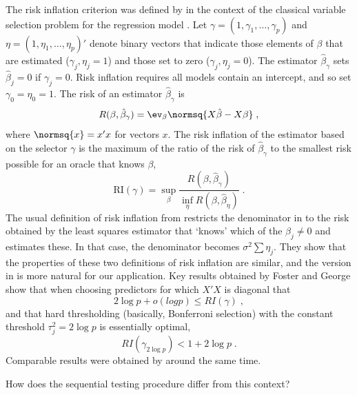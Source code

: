 \documentclass[12pt]{article}
\begin{document}
 The risk inflation criterion was defined by \citet{fostergeorge94} in the
 context of the classical variable selection problem for the regression model
 .  Let $\gamma = (1, \gamma_1, \ldots, \gamma_p)$ and $\eta = (1,
 \eta_1, \ldots,\eta_p)'$ denote binary vectors that indicate those elements of
 $\beta$ that are estimated ($\gamma_j,\eta_j=1$) and those set to zero
 ($\gamma_j,\eta_j = 0$).  The estimator $\hat\beta_\gamma$ sets $\hat\beta_j =
 0$ if $\gamma_j=0$.  Risk inflation requires all models contain an intercept,
 and so set $\gamma_0=\eta_0=1$.  The risk of an estimator $\hat\beta_\gamma$ is
 \begin{equation}
    R(\beta, \hat\beta_\gamma) = \ev_\beta \normsq{X\hat\beta - X\beta}  \;,
 \label{eq:risk}
 \end{equation}
 where $\normsq{x} = x'x$ for vectors $x$.  The risk inflation of the estimator
 based on the selector $\gamma$ is the maximum of the ratio of the risk of
 $\hat\beta_\gamma$ to the smallest risk possible for an oracle that knows
 $\beta$,
 \begin{equation}
    \mbox{RI}(\gamma) = \sup_\beta 
                        \frac{R(\beta, \hat\beta_\gamma)}
                        {\inf_\eta{R(\beta, \hat\beta_\eta)}}   \;.
 \label{eq:ri}
 \end{equation}
 The usual definition of risk inflation from \citet{fostergeorge94} restricts
 the denominator in  to the risk obtained by the least squares
 estimator that `knows' which of the $\beta_j \ne 0$ and estimates these.  In
 that case, the denominator becomes $\sigma^2 \sum \eta_j$.  They show that the
 properties of these two definitions of risk inflation are similar, and the
 version in  is more natural for our application.  Key results
 obtained by Foster and George show that when choosing predictors for which $X'X$
 is diagonal that
 \begin{equation}
     2 \log p + o(log p) \le  RI(\gamma) \;,
 \label{eq:lower}
 \end{equation}
 and that hard thresholding (basically, Bonferroni selection) with the constant
 threshold $\tau_j^2= 2 \log p$ is essentially optimal,
 \begin{equation}
       RI(\gamma_{2 \log p}) < 1 + 2 \log p \;.
 \label{eq:upper}
 \end{equation}
 Comparable results were obtained by \citet{donohojohnstone94} around the same time. 


 How does the sequential testing procedure differ from this context?
\end{document}
